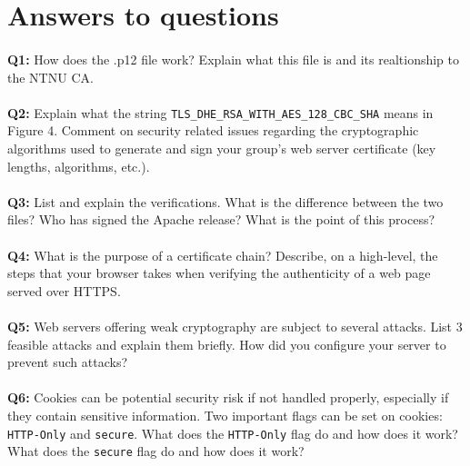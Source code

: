 \section{Answers to questions}

\paragraph{}
\textbf{Q1:}
How does the .p12 file work? Explain what this file is and its realtionship to the NTNU CA.

\paragraph{}
\textbf{Q2:}
Explain what the string \verb/TLS_DHE_RSA_WITH_AES_128_CBC_SHA/ means in Figure 4. Comment on security related issues regarding the cryptographic algorithms used to generate and sign your group's web server certificate (key lengths, algorithms, etc.).

\paragraph{}
\textbf{Q3:}
List and explain the verifications. What is the difference between the two files? Who has signed the Apache release? What is the point of this process?

\paragraph{}
\textbf{Q4:}
What is the purpose of a certificate chain? Describe, on a high-level, the steps that your browser takes when verifying the authenticity of a web page served over HTTPS.

\paragraph{}
\textbf{Q5:}
Web servers offering weak cryptography are subject to several attacks. List 3 feasible attacks and explain them briefly. How did you configure your server to prevent such attacks?

\paragraph{}
\textbf{Q6:}
Cookies can be potential security risk if not handled properly, especially if they contain sensitive information. Two important flags can be set on cookies: \verb/HTTP-Only/ and \verb/secure/. What does the \verb/HTTP-Only/ flag do and how does it work? What does the \verb/secure/ flag do and how does it work?

